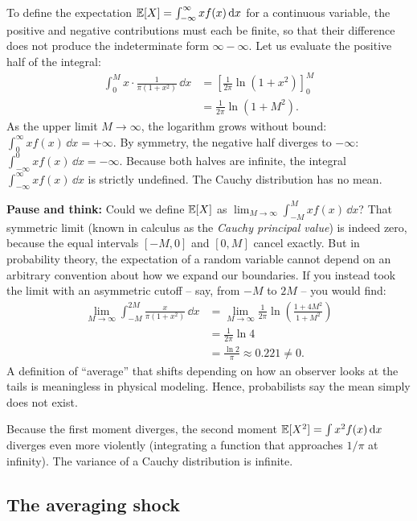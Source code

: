 \begin{trapbox}
To define the expectation $\operatorname{\mathbb{E}}[X] = \int_{-\infty}^\infty x f(x)\,\mathrm{d} x$ for a
continuous variable, the positive and negative contributions must each be
finite, so that their difference does not produce the indeterminate form
$\infty - \infty$.
Let us evaluate the positive half of the integral:
\begin{align*}
  \int_0^M x \cdot \frac{1}{\pi(1+x^2)}\,\dd x
  &= \left[ \frac{1}{2\pi}\ln(1+x^2) \right]_0^M \\
  &= \frac{1}{2\pi}\ln(1+M^2).
\end{align*}
As the upper limit $M \to \infty$, the logarithm grows without bound:
$\int_0^\infty x f(x)\,\dd x = +\infty$.
By symmetry, the negative half diverges to $-\infty$:
$\int_{-\infty}^0 x f(x)\,\dd x = -\infty$.
Because both halves are infinite, the integral $\int_{-\infty}^\infty x f(x)\,\dd x$
is strictly undefined. The Cauchy distribution has no mean.
\end{trapbox}

\begin{walkbox}
\textbf{Pause and think:} Could we define $\operatorname{\mathbb{E}}[X]$ as $\lim_{M \to \infty} \int_{-M}^M x f(x)\,\dd x$?
That symmetric limit (known in calculus as the \emph{Cauchy principal value})
is indeed zero, because the equal intervals $[-M, 0]$ and $[0, M]$ cancel
exactly. But in probability theory, the expectation of a random variable cannot
depend on an arbitrary convention about how we expand our boundaries. If you
instead took the limit with an asymmetric cutoff -- say, from $-M$ to $2M$ -- you
would find:
\begin{align*}
  \lim_{M \to \infty} \int_{-M}^{2M} \frac{x}{\pi(1+x^2)}\,\dd x
  &= \lim_{M \to \infty} \frac{1}{2\pi}\ln\left(\frac{1+4M^2}{1+M^2}\right) \\
  &= \frac{1}{2\pi}\ln 4 \\
  &= \frac{\ln 2}{\pi} \approx 0.221 \ne 0.
\end{align*}
A definition of ``average'' that shifts depending on how an observer looks at the
tails is meaningless in physical modeling. Hence, probabilists say the mean
simply does not exist.
\end{walkbox}

Because the first moment diverges, the second moment $\operatorname{\mathbb{E}}[X^2] = \int x^2 f(x)\,\mathrm{d} x$
diverges even more violently (integrating a function that approaches $1/\pi$ at
infinity). The variance of a Cauchy distribution is infinite.

\subsection{The averaging shock}

